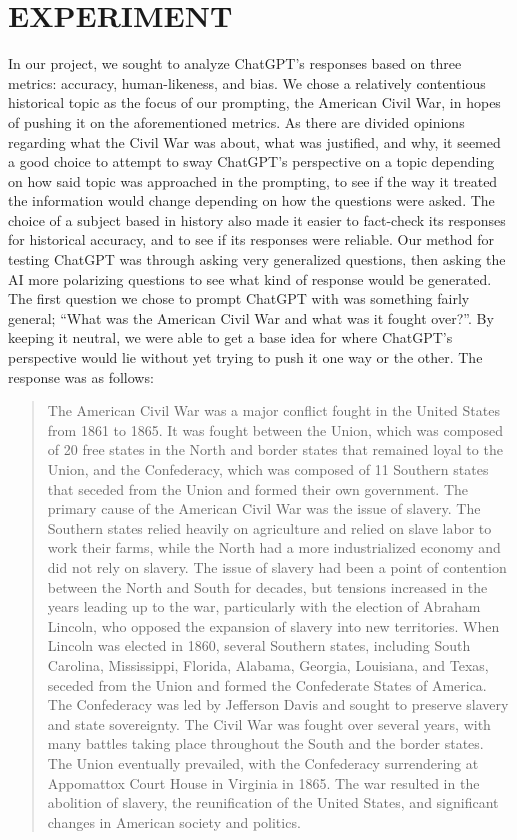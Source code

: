 \documentclass[letterpaper, 10pt, conference]{ieeeconf}
\begin{document}
    \section{EXPERIMENT}
    
    In our project, we sought to analyze ChatGPT’s responses based on three metrics: accuracy, human-likeness, and bias. We chose a
    relatively contentious historical topic as the focus of our prompting, the American Civil War, in hopes of pushing it on the
    aforementioned metrics. As there are divided opinions regarding what the Civil War was about, what was justified, and why, it
    seemed a good choice to attempt to sway ChatGPT’s perspective on a topic depending on how said topic was approached in the
    prompting, to see if the way it treated the information would change depending on how the questions were asked. The choice of a
    subject based in history also made it easier to fact-check its responses for historical accuracy, and to see if its responses were
    reliable.
    Our method for testing ChatGPT was through asking very generalized questions, then asking the AI more polarizing questions to
    see what kind of response would be generated. The first question we chose to prompt ChatGPT with was something fairly general;
    “What was the American Civil War and what was it fought over?”. By keeping it neutral, we were able to get a base idea for where
    ChatGPT’s perspective would lie without yet trying to push it one way or the other. The response was as follows:
    \begin{quote}
    The American Civil War was a major conflict fought in the United States from 1861 to 1865. It was
    fought between the Union, which was composed of 20 free states in the North and border states
    that remained loyal to the Union, and the Confederacy, which was composed of 11 Southern states
    that seceded from the Union and formed their own government.
    The primary cause of the American Civil War was the issue of slavery. The Southern states relied
    heavily on agriculture and relied on slave labor to work their farms, while the North had a more
    industrialized economy and did not rely on slavery. The issue of slavery had been a point of
    contention between the North and South for decades, but tensions increased in the years leading up
    to the war, particularly with the election of Abraham Lincoln, who opposed the expansion of slavery
    into new territories.
    When Lincoln was elected in 1860, several Southern states, including South Carolina, Mississippi,
    Florida, Alabama, Georgia, Louisiana, and Texas, seceded from the Union and formed the
    Confederate States of America. The Confederacy was led by Jefferson Davis and sought to preserve
    slavery and state sovereignty.
    The Civil War was fought over several years, with many battles taking place throughout the South
    and the border states. The Union eventually prevailed, with the Confederacy surrendering at
    Appomattox Court House in Virginia in 1865. The war resulted in the abolition of slavery, the
    reunification of the United States, and significant changes in American society and politics.
    \end{quote}
\end{document}
